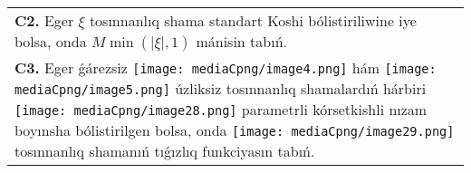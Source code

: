 \documentclass{article}
\begin{document}
\begin{tabular}{m{17cm}}
 \\
\textbf{C2.} Eger \(\xi\) tosınnanlıq shama standart Koshi bólistiriliwine iye bolsa, onda \(M\min\left( |\xi|,1 \right)\) mánisin tabıń.
 \\
\textbf{C3.} Eger ǵárezsiz \texttt{[image: mediaCpng/image4.png]} hám \texttt{[image: mediaCpng/image5.png]} úzliksiz tosınnanlıq shamalardıń hárbiri \texttt{[image: mediaCpng/image28.png]} parametrli kórsetkishli nızam boyınsha bólistirilgen bolsa, onda \texttt{[image: mediaCpng/image29.png]} tosınnanlıq shamanıń tıǵızlıq funkciyasın tabıń.
 \\

\end{tabular}
\vspace{1cm}
\end{document}

